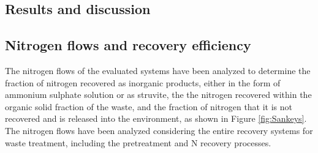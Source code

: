\begin{refsection}[referencesCh6]


\section{Results and discussion}
\subsection{Nitrogen flows and recovery efficiency}
%

The nitrogen flows of the evaluated systems have been analyzed to determine the fraction of nitrogen recovered as inorganic products, either in the form of ammonium sulphate solution or as struvite, the the nitrogen recovered within the organic solid fraction of the waste, and the fraction of nitrogen that it is not recovered and is released into the environment, as shown in Figure \ref{fig:Sankeys}. The nitrogen flows have been analyzed considering the entire recovery systems for waste treatment, including the pretreatment and N recovery processes.


\end{refsection}
